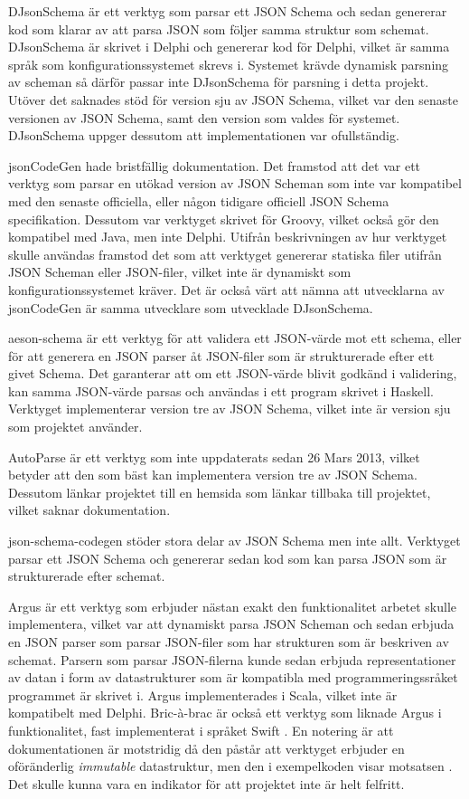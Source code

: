 DJsonSchema är ett verktyg som parsar ett JSON Schema och sedan genererar kod som klarar av att parsa JSON som följer samma struktur som schemat. DJsonSchema är skrivet i Delphi och genererar kod för Delphi, vilket är samma språk som konfigurationssystemet skrevs i. Systemet krävde dynamisk parsning av scheman så därför passar inte DJsonSchema för parsning i detta projekt. Utöver det saknades stöd för version sju av JSON Schema, vilket var den senaste versionen av JSON Schema, samt den version som valdes för systemet. DJsonSchema uppger dessutom att implementationen var ofullständig. \cite{Schlothauer&WauerGmbH}

jsonCodeGen hade bristfällig dokumentation. Det framstod att det var ett verktyg som parsar en utökad version av JSON Scheman som inte var kompatibel med den senaste officiella, eller någon tidigare officiell JSON Schema specifikation. Dessutom var verktyget skrivet för Groovy, vilket också gör den kompatibel med Java, men inte Delphi. Utifrån beskrivningen av hur verktyget skulle användas framstod det som att verktyget genererar statiska filer utifrån JSON Scheman eller JSON-filer, vilket inte är dynamiskt som konfigurationssystemet kräver. Det är också värt att nämna att utvecklarna av jsonCodeGen är samma utvecklare som utvecklade DJsonSchema. \cite{Schlothauer&WauerGmbHa} 

aeson-schema är ett verktyg för att validera ett JSON-värde mot ett schema, eller för att generera en JSON parser åt JSON-filer som är strukturerade efter ett givet Schema. Det garanterar att om ett JSON-värde blivit godkänd i validering, kan samma JSON-värde parsas och användas i ett program skrivet i Haskell. Verktyget implementerar version tre av JSON Schema, vilket inte är version sju som projektet använder. \cite{Kowalczyk}

AutoParse är ett verktyg som inte uppdaterats sedan 26 Mars 2013, vilket betyder att den som bäst kan implementera version tre av JSON Schema. Dessutom länkar projektet till en hemsida som länkar tillbaka till projektet, vilket saknar dokumentation. \cite{Googleb}

json-schema-codegen stöder stora delar av JSON Schema men inte allt. Verktyget parsar ett JSON Schema och genererar sedan kod som kan parsa JSON som är strukturerade efter schemat. \cite{Tundra}

Argus är ett verktyg som erbjuder nästan exakt den funktionalitet arbetet skulle implementera, vilket var att dynamiskt parsa JSON Scheman och sedan erbjuda en JSON parser som parsar JSON-filer som har strukturen som är beskriven av schemat. Parsern som parsar JSON-filerna kunde sedan erbjuda representationer av datan i form av datastrukturer som är kompatibla med programmeringssråket programmet är skrivet i. Argus implementerades i Scala, vilket inte är kompatibelt med Delphi. \cite{Fenton} Bric-à-brac är också ett verktyg som liknade Argus i funktionalitet, fast implementerat i språket Swift \cite{GlimpseI/OInc}. En notering är att dokumentationen är motstridig då den påstår att verktyget erbjuder en oföränderlig \textit{immutable} datastruktur, men den i exempelkoden visar motsatsen \cite{GlimpseI/OInc}. Det skulle kunna vara en indikator för att projektet inte är helt felfritt.

